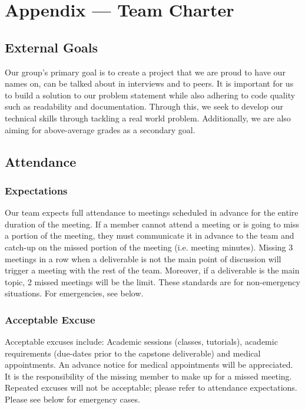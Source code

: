 \documentclass{article}
\begin{document}
\newpage{}

\section*{Appendix --- Team Charter}


\subsection*{External Goals}

Our group's primary goal is to create a project that we are proud to have our names
on, can be talked about in interviews and to peers. It is important for us to build 
a solution to our problem statement while also adhering to code quality such as 
readability and documentation. Through this, we seek to develop our technical skills 
through tackling a real world problem. Additionally, we are also aiming for above-average 
grades as a secondary goal. 

\subsection*{Attendance}

\subsubsection*{Expectations}

Our team expects full attendance to meetings scheduled in advance for the entire duration 
of the meeting. If a member cannot attend a meeting or is going to miss a portion of the meeting, 
they must communicate it in advance to the team and catch-up on the missed portion of the meeting 
(i.e. meeting minutes). Missing 3 meetings in a row when a deliverable is not the main point of 
discussion will trigger a meeting with the rest of the team. Moreover, if a deliverable is the 
main topic, 2 missed meetings will be the limit. These standards are for non-emergency situations. 
For emergencies, see below. 

\subsubsection*{Acceptable Excuse}

Acceptable excuses include: Academic sessions (classes, tutorials), academic requirements (due-dates
prior to the capstone deliverable) and medical appointments. An advance notice for medical 
appointments will be appreciated. It is the responsibility of the missing member to make up for a 
missed meeting. Repeated excuses will not be acceptable; please refer to attendance expectations. 
Please see below for emergency cases.
\end{document}
